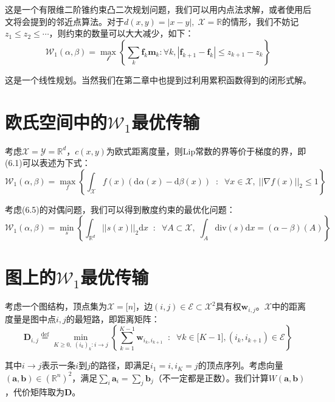 \documentclass[cn,10pt,math=newtx,citestyle=gb7714-2015,bibstyle=gb7714-2015]{elegantbook}
\begin{document}
这是一个有限维二阶锥约束凸二次规划问题，我们可以用内点法求解，或者使用后文将会提到的邻近点算法。对于$d(x,y)=|x-y|,\;\mathcal{X}=\mathbb{R}$的情形，我们不妨记$z_1\leq z_2 \leq \cdots$，则约束的数量可以大大减少，如下：
\begin{equation}
    \mathcal{W}_1(\alpha,\beta) = \max_{\mathcal{f}}\left\{ \sum_k \mathbf{f}_k\mathbf{m}_k : \forall k, |\mathbf{f}_{k+1}-\mathbf{f}_k| \leq z_{k+1}-z_k \right\}
\end{equation}

这是一个线性规划。当然我们在第二章中也提到过利用累积函数得到的闭形式解。

\section{欧氏空间中的$\mathcal{W}_1$最优传输}

考虑$\mathcal{X}=\mathcal{Y}=\mathbb{R}^d$，$c(x,y)$为欧式距离度量，则Lip常数的界等价于梯度的界，即(6.1)可以表述为下式：
\begin{equation}
    \mathcal{W}_1(\alpha,\beta) = \max_f \left\{ \int_\mathcal{X} f(x)(\text{d}\alpha(x)-\text{d}\beta(x))\;\; : \;\;\forall x\in \mathcal{X},\;||\nabla f(x)||_2\leq 1 \right\}
\end{equation}

考虑(6.5)的对偶问题，我们可以得到散度约束的最优化问题：
\begin{equation}
    \mathcal{W}_1(\alpha,\beta) = \min_s \left\{ \int_{\mathbb{R}^d} ||s(x)||_2 \text{d}x \; \; : \; \; \forall A\subset\mathcal{X}, \;\int_A\text{div}(s)\text{d} x=(\alpha-\beta)(A) \right\}
\end{equation}

\section{图上的$\mathcal{W}_1$最优传输}

考虑一个图结构，顶点集为$\mathcal{X}=\mathbb{[}n\mathbb{]}$，边$(i,j)\in\mathcal{E}\subset\mathcal{X}^2$具有权$\mathbf{w}_{i,j}$。$\mathcal{X}$中的距离度量是图中点$i,j$的最短路，即距离矩阵：
\begin{equation}
    \mathbf{D}_{i,j} \overset{\text{def}}{=} \min_{K\geq 0,\;(i_k)_k:i\to j} \left\{ \sum_{k=1}^{K-1} \mathbf{w}_{i_k,i_{k+1}} \;\; : \;\; \forall k\in \mathbb{[}K-1\mathbb{]} , (i_k,i_{k+1})\in\mathcal{E}  \right\}
\end{equation}

其中$i\to j$表示一条$i$到$j$的路径，即满足$i_1=i,i_K=j$的顶点序列。考虑向量$(\mathbf{a,b})\in(\mathbb{R}^n)^2$，满足$\sum_i \mathbf{a}_i=\sum_j \mathbf{b}_j$（不一定都是正数）。我们计算$W(\mathbf{a,b})$，代价矩阵取为$\mathbf{D}$。
\end{document}
